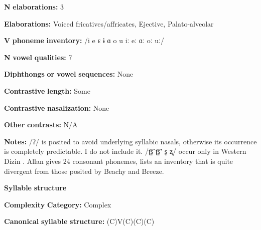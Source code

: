\begin{styleBody}
\textbf{N} \textbf{elaborations:} 3
\end{styleBody}

\begin{styleBody}
\textbf{Elaborations:} Voiced fricatives/affricates, Ejective, Palato-alveolar
\end{styleBody}

\begin{styleBody}
\textbf{V} \textbf{phoneme} \textbf{inventory:} /i e ɛ ɨ ɑ o u iː eː ɑː oː uː/
\end{styleBody}

\begin{styleBody}
\textbf{N} \textbf{vowel} \textbf{qualities:} 7
\end{styleBody}

\begin{styleBody}
\textbf{Diphthongs} \textbf{or} \textbf{vowel} \textbf{sequences:} None
\end{styleBody}

\begin{styleBody}
\textbf{Contrastive} \textbf{length:} Some
\end{styleBody}

\begin{styleBody}
\textbf{Contrastive} \textbf{nasalization:} None
\end{styleBody}

\begin{styleBody}
\textbf{Other} \textbf{contrasts:} N/A
\end{styleBody}

\begin{styleBody}
\textbf{Notes:} /ʔ/ is posited to avoid underlying syllabic nasals, otherwise its occurrence is completely predictable. I do not include it. /ʈ͡ʂ ʈ͡ʂ’ ʂ ʐ/ occur only in Western Dizin \citep{Beach2005}. Allan gives 24 consonant phonemes, lists an inventory that is quite divergent from those posited by Beachy and Breeze.
\end{styleBody}

\begin{styleBody}
\textbf{Syllable} \textbf{structure}
\end{styleBody}

\begin{styleBody}
\textbf{Complexity} \textbf{Category:} Complex
\end{styleBody}

\begin{styleBody}
\textbf{Canonical} \textbf{syllable} \textbf{structure:} (C)V(C)(C)(C) \citep[38-46]{Beachy2005}
\end{styleBody}

